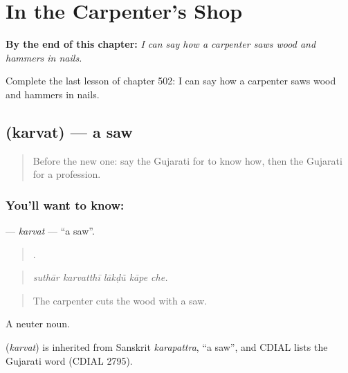
\chapter{In the Carpenter's Shop}
\label{ch:gu-in-the-carpenter-s-shop}

\begin{chapteropening}
\textbf{By the end of this chapter:} \emph{I can say how a carpenter saws wood and hammers in nails.}

Complete the last lesson of chapter 502: I can say how a carpenter saws wood and hammers in nails.
\end{chapteropening}

\section[\texorpdfstring{\gu{કરવત} (karvat)}{કરવત (karvat)}]{ (karvat) — a saw}

\label{lesson:GU-C502-karvat}



\begin{quote}
Before the new one: say the Gujarati for to know how, then the Gujarati for a profession.
\end{quote}

\subsection*{You'll want to know: }
\textbf{} — \emph{karvat} — \textquotedblleft{}a saw\textquotedblright{}.

\begin{quote}
    .
\end{quote}

\begin{quote}
\emph{suthār karvatthī lākḍũ kāpe che.}
\end{quote}

\begin{quote}
The carpenter cuts the wood with a saw.
\end{quote}

A neuter noun.

\begin{cousinweb}
\textbf{} (\emph{karvat}) is inherited from Sanskrit \emph{karapattra}, \textquotedblleft{}a saw\textquotedblright{}, and CDIAL lists the Gujarati word (CDIAL 2795).
\end{cousinweb}


